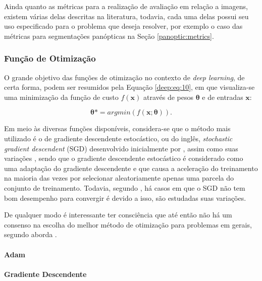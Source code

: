 Ainda quanto as métricas para a realização de avaliação em relação a imagens, existem várias delas descritas na literatura, todavia,  cada uma delas possui seu uso especificado para o problema que deseja resolver, por exemplo o caso das métricas para segmentações panópticas na Seção \ref{panoptic:metrics}.


\subsubsection{Função de Otimização}
\label{deep:optimization}

O grande objetivo das funções de otimização no contexto de \textit{deep learning}, de certa forma, podem ser resumidos pela Equação \ref{deep:eq:10}, em que visualiza-se uma minimização da função de custo $f(\boldsymbol{x})$ através de pesos $\boldsymbol{\theta}$ e de entradas $\boldsymbol{x}$:

\begin{equation}
    \label{deep:eq:10}
    \boldsymbol{\theta}* = argmin(f(\boldsymbol{x};\boldsymbol{\theta})).
\end{equation}

Em meio às diversas funções disponíveis, considera-se que o método mais utilizado é o de gradiente descendente estocástico, ou do inglês, \textit{stochastic gradient descendent} (SGD) desenvolvido inicialmente por \cite{cauchy1847methode}, assim como suas variações \cite{Goodfellow2016}, sendo que o gradiente descendente estocástico é considerado como uma adaptação do gradiente descendente e que causa a aceleração do treinamento na maioria das vezes por selecionar aleatoriamente apenas uma parcela do conjunto de treinamento. Todavia, segundo \cite{Goodfellow2016}, há casos em que o SGD não tem bom desempenho para convergir é devido a isso, são estudadas suas variações.

De qualquer modo é interessante ter consciência que até então não há um consenso na escolha do melhor método de otimização para problemas em gerais, segundo aborda \cite{Goodfellow2016}.

\paragraph{Adam}


\paragraph{Gradiente Descendente}


